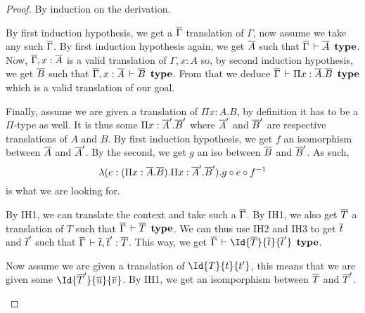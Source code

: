 
\begin{proof}
  By induction on the derivation.
  \begin{caselist}
    \nextcase
    \begin{mathpar}
    \end{mathpar}
    By first induction hypothesis, we get a $\barG$ translation of $\Gamma$,
    now assume we take any such $\barG$.
    By first induction hypothesis again, we get $\barA$ such that
    $\barG \der \barA\ \type$.
    Now, $\barG, x:\barA$ is a valid translation of $\Gamma, x:A$ so,
    by second induction hypothesis, we get $\barB$ such that
    $\barG, x:\barA \der \barB\ \type$.
    From that we deduce $\barG \der \Pi x:\barA.\barB\ \type$ which is a valid
    translation of our goal.

    Finally, assume we are given a translation of $\Pi x:A.B$, by definition
    it has to be a $\Pi$-type as well. It is thus some $\Pi x:\barA'.\barB'$
    where $\barA'$ and $\barB'$ are respective translations of $A$ and $B$.
    By first induction hypothesis, we get $f$ an isomorphism between $\barA$
    and $\barA'$. By the second, we get $g$ an iso between $\barB$ and $\barB'$.
    As such,
    \begin{equation*}
    \lambda (e:(\Pi x:\barA.\barB).\Pi x:\barA'.\barB'). g \circ e \circ f^{-1}
    \end{equation*}
    is what we are looking for.

    \nextcase
    \begin{mathpar}
    \end{mathpar}
    By IH1, we can translate the context and take such a $\barG$.
    By IH1, we also get $\barT$ a translation of $T$ such that
    $\barG \der \barT\ \type$.
    We can thus use IH2 and IH3 to get $\bart$ and $\bart'$ such that
    $\barG \der \bart, \bart' : \barT$.
    This way, we get $\barG \der \Id{\barT}{\bart}{\bart'}\ \type$.

    Now assume we are given a translation of $\Id{T}{t}{t'}$, this means that
    we are given some $\Id{\barT'}{\baru}{\barv}$.
    By IH1, we get an isomporphism between $\barT$ and $\barT'$.


\end{caselist}
\end{proof}
